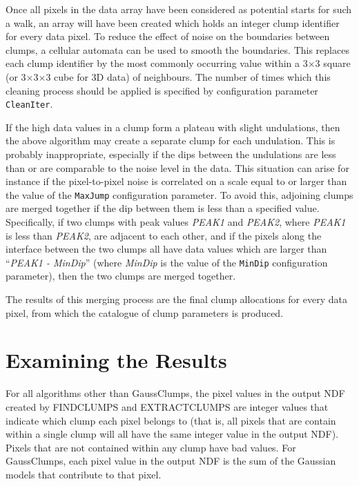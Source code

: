 \documentclass[twoside,11pt]{article}
\newcommand{\htmlref}[2]{#1}
\renewcommand{\_}{\texttt{\symbol{95}}}
\begin{document}
Once all pixels in the data array have been considered as potential
starts for such a walk, an array will have been created which holds an
integer clump identifier for every data pixel. To reduce the effect of
noise on the boundaries between clumps, a cellular automata can be used
to smooth the boundaries. This replaces each clump identifier by the most
commonly occurring value within a 3$\times$3 square (or 3$\times$3$\times$3
cube for 3D data)
of neighbours. The number of times which this cleaning process should be
applied is specified by configuration parameter {\tt CleanIter}.

If the high data values in a clump form a plateau with slight
undulations, then the above algorithm may create a separate clump for
each undulation. This is probably inappropriate, especially if the dips
between the undulations are less than or are comparable to the noise
level in the data. This situation can arise for instance if the
pixel-to-pixel noise is correlated on a scale equal to or larger than the
value of the {\tt MaxJump} configuration parameter. To avoid this, adjoining
clumps are merged together if the dip between them is less than a
specified value. Specifically, if two clumps with peak values \emph{PEAK1}
and  \emph{PEAK2}, where \emph{PEAK1} is less than \emph{PEAK2}, are
adjacent to each other, and if the pixels along the interface between the
two clumps all have data values which are larger than ``\emph{PEAK1 - MinDip}''
(where \emph{MinDip} is the value of the {\tt MinDip} configuration
parameter), then the two clumps are merged together.

The results of this merging process are the final clump allocations for
every data pixel, from which the catalogue of clump parameters is
produced.

\section{Examining the Results}

For all algorithms other than GaussClumps, the pixel values in the output
NDF created by \htmlref{FINDCLUMPS}{FINDCLUMPS} and
\htmlref{EXTRACTCLUMPS}{EXTRACTCLUMPS} are integer values that indicate
which clump each pixel belongs to (that is, all pixels that are contain
within a single clump will all have the same integer value in the output
NDF). Pixels that are not contained within any clump have bad values.
For GaussClumps, each pixel value in the output NDF is the sum of the
Gaussian models that contribute to that pixel.
\end{document}

